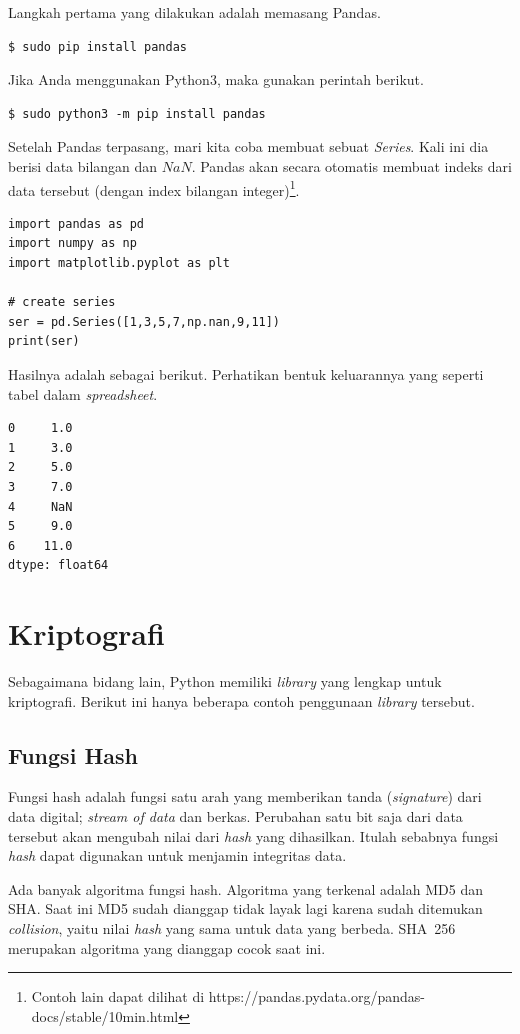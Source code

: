 Langkah pertama yang dilakukan adalah memasang Pandas.

\begin{verbatim}
$ sudo pip install pandas
\end{verbatim}

Jika Anda menggunakan Python3, maka gunakan perintah berikut.
\begin{verbatim}
$ sudo python3 -m pip install pandas
\end{verbatim}

Setelah Pandas terpasang, mari kita coba membuat sebuat {\em Series}.
Kali ini dia berisi data bilangan dan $NaN$.
Pandas akan secara otomatis membuat indeks dari data tersebut (dengan
index bilangan integer)\footnote{Contoh lain dapat dilihat di
https://pandas.pydata.org/pandas-docs/stable/10min.html}.

\begin{verbatim}
import pandas as pd
import numpy as np
import matplotlib.pyplot as plt

# create series
ser = pd.Series([1,3,5,7,np.nan,9,11])
print(ser)
\end{verbatim}

Hasilnya adalah sebagai berikut. Perhatikan bentuk keluarannya
yang seperti tabel dalam {\em spreadsheet}.
\begin{verbatim}
0     1.0
1     3.0
2     5.0
3     7.0
4     NaN
5     9.0
6    11.0
dtype: float64
\end{verbatim}




\section{Kriptografi}
Sebagaimana bidang lain, Python memiliki {\em library} yang lengkap untuk
kriptografi. Berikut ini hanya beberapa contoh penggunaan {\em library}
tersebut.

\subsection{Fungsi Hash}
Fungsi hash adalah fungsi satu arah yang memberikan tanda ({\em signature})
dari data digital; {\em stream of data} dan berkas.
Perubahan satu bit saja dari data tersebut akan mengubah nilai dari
{\em hash} yang dihasilkan. Itulah sebabnya fungsi {\em hash} dapat
digunakan untuk menjamin integritas data.

Ada banyak algoritma fungsi hash. Algoritma yang terkenal adalah MD5
dan SHA. Saat ini MD5 sudah dianggap tidak layak lagi karena sudah
ditemukan {\em collision}, yaitu nilai {\em hash} yang sama untuk data
yang berbeda. SHA~256 merupakan algoritma yang dianggap cocok saat ini.

